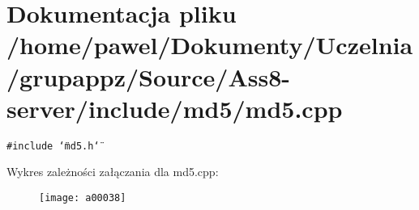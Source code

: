 \hypertarget{a00009}{
\section{Dokumentacja pliku /home/pawel/Dokumenty/Uczelnia/grupappz/Source/Ass8-server/include/md5/md5.cpp}
\label{a00009}
}
{\tt \#include \char`\"{}md5.h\char`\"{}}\par


Wykres zależności załączania dla md5.cpp:\nopagebreak
\begin{figure}[H]
\begin{center}
\leavevmode
\texttt{[image: a00038]}
\end{center}
\end{figure}
